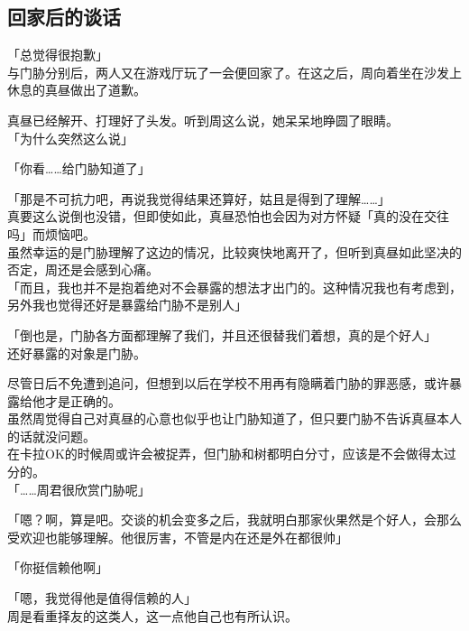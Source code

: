 \subsection{回家后的谈话}

「总觉得很抱歉」\\

与门胁分别后，两人又在游戏厅玩了一会便回家了。在这之后，周向着坐在沙发上休息的真昼做出了道歉。

真昼已经解开、打理好了头发。听到周这么说，她呆呆地睁圆了眼睛。\\

「为什么突然这么说」

「你看……给门胁知道了」

「那是不可抗力吧，再说我觉得结果还算好，姑且是得到了理解……」\\

真要这么说倒也没错，但即使如此，真昼恐怕也会因为对方怀疑「真的没在交往吗」而烦恼吧。\\

虽然幸运的是门胁理解了这边的情况，比较爽快地离开了，但听到真昼如此坚决的否定，周还是会感到心痛。\\

「而且，我也并不是抱着绝对不会暴露的想法才出门的。这种情况我也有考虑到，另外我也觉得还好是暴露给门胁不是别人」

「倒也是，门胁各方面都理解了我们，并且还很替我们着想，真的是个好人」\\

还好暴露的对象是门胁。

尽管日后不免遭到追问，但想到以后在学校不用再有隐瞒着门胁的罪恶感，或许暴露给他才是正确的。\\

虽然周觉得自己对真昼的心意也似乎也让门胁知道了，但只要门胁不告诉真昼本人的话就没问题。\\

在卡拉OK的时候周或许会被捉弄，但门胁和树都明白分寸，应该是不会做得太过分的。\\

「……周君很欣赏门胁呢」

「嗯？啊，算是吧。交谈的机会变多之后，我就明白那家伙果然是个好人，会那么受欢迎也能够理解。他很厉害，不管是内在还是外在都很帅」

「你挺信赖他啊」

「嗯，我觉得他是值得信赖的人」\\

周是看重择友的这类人，这一点他自己也有所认识。\\

